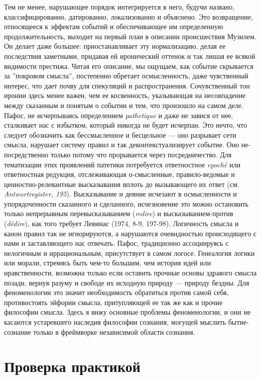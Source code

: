\documentclass[12pt]{book}
\begin{document}
Тем не менее, нарушающее порядок интегрируется в него, будучи названо, классифицированно, датированно, локализованно и объяснено. Это возвращение, относящееся к эффектам событий и обеспечивающее им определенную продолжительность, выходит на первый план в описании происшествия Музилем. Он делает даже большее: приостанавливает эту нормализацию, делая ее последствия заметными, придавая ей иронический оттенок и так лишая ее всякой видимости престижа. Читая его описание, мы ощущаем, как событие скрывается за ''покровом смысла'', постепенно обретает осмысленность, даже чувственный интерес, что дает почву для спекуляций и распространения. Сочувственный тон иронии здесь менее важен, чем ее косвенность, указывающая на несовпадение между сказанным и понятым о событии и тем, что произошло на самом деле. Пафос, не исчерпываясь определением \textit{pathetique} и даже не завися от нее, сталкивает нас с избытком, который никогда не будет исчерпан. Это нечто, что следует обозначить как бессмысленное и бесцельное --- оно разрывает сети смысла, нарушает систему правил и так деконтекстуализирует событие. Оно не-посредственно только потому что прорывается через посредничество. Для тематизации этих проявлений патетики потребуется ответностное \textit{epoché} или ответностная редукция, отслеживающая о-смысленные, правило-ведомые и ценностно-релевантные высказывания вплоть до вызывающего их ответ (см. \textit{Antwortregister, 195}). Высказывание и деяние исчезают в осмысленности и упорядоченности сказанного и сделанного, исчезновение это можно остановить только непрерывным перевысказыванием (\textit{redire}) и высказыванием-против (\textit{dédire}), как того требует Левинас (1974, 8-9, 197-98). Логичность смысла и канон правил так не игнорируются, а нарушаются очевидностью происходящего с нами и заставляющего нас отвечать. Пафос, традиционно ассоциируясь с нелогичным и иррациональным, присутствует в самом логосе. Генеалогия логики или морали, стремясь быть чем-то большим, чем история идей или нравственности, возможна только если оставить прочные основы здравого смысла позади, вернув разуму и свободе их исходную природу --- природу бездны. Для феноменологии это значит необходимость обратиться против самой себя, противостоять эйфории смысла, притупляющей ее так же как и прочие философии смысла. Здесь я вижу основные проблемы феноменологии, и они не касаются устаревшего наследия философии сознания, могущей мыслить бытие-сознание только в фреймворке независимой области сознания.

\section{Проверка практикой}
\end{document}
